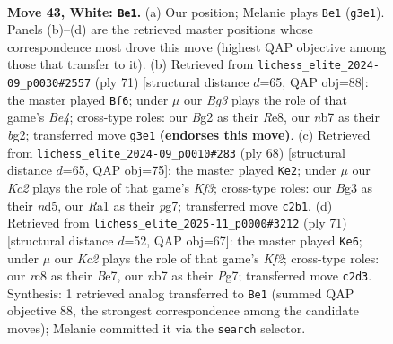 \documentclass[11pt]{article}
\begin{document}
\clearpage

\begin{figure}[p]\centering
\begin{subfigure}{0.46\textwidth}\centering
\resizebox{\linewidth}{!}{%
\newchessgame
\chessboard[
  setfen={1rr5/1n3kbp/p2p4/P3p1Pp/1pP1P3/1P3PBR/2K3B1/R7 w - - 0 43},
  showmover=false,
  pgfstyle=straightmove, color=movearrow, markmove={g3-e1}
]}
\caption{}
\end{subfigure}\hfill
\begin{subfigure}{0.46\textwidth}\centering
\resizebox{\linewidth}{!}{%
\newchessgame
\chessboard[
  setfen={4r3/3R2pk/2p1r3/p1B1bp2/P3p1p1/2P3P1/1P1R1PB1/6K1 b - - 1 36},
  showmover=false,
  pgfstyle=straightmove, color=movearrow, markmove={e5-f6}
]}
\caption{}
\end{subfigure}
\\[4pt]
\begin{subfigure}{0.46\textwidth}\centering
\resizebox{\linewidth}{!}{%
\newchessgame
\chessboard[
  setfen={4r3/5kp1/3r4/Bp1npp1p/1Pp4P/2P2KP1/3P1P2/R3R3 w - - 0 35},
  showmover=false,
  pgfstyle=straightmove, color=movearrow, markmove={f3-e2}
]}
\caption{}
\end{subfigure}\hfill
\begin{subfigure}{0.46\textwidth}\centering
\resizebox{\linewidth}{!}{%
\newchessgame
\chessboard[
  setfen={8/1r1rbkp1/p4p1p/4p2P/PPp5/2B3P1/2P2PK1/1R2R3 b - - 2 36},
  showmover=false,
  pgfstyle=straightmove, color=movearrow, markmove={f7-e6}
]}
\caption{}
\end{subfigure}
\caption{\textbf{Move 43, White: \texttt{Be1}.} (a) Our position; Melanie plays \texttt{Be1} (\texttt{g3e1}). Panels (b)--(d) are the retrieved master positions whose correspondence most drove this move (highest QAP objective among those that transfer to it). (b) Retrieved from \texttt{lichess\_elite\_2024-09\_p0030\#2557} (ply 71) [structural distance $d$=65, QAP obj=88]: the master played \texttt{Bf6}; under $\mu$ our \emph{Bg3} plays the role of that game's \emph{Be4}; cross-type roles: our \emph{B}g2 as their \emph{R}e8, our \emph{n}b7 as their \emph{b}g2; transferred move \texttt{g3e1} \textbf{(endorses this move)}. (c) Retrieved from \texttt{lichess\_elite\_2024-09\_p0010\#283} (ply 68) [structural distance $d$=65, QAP obj=75]: the master played \texttt{Ke2}; under $\mu$ our \emph{Kc2} plays the role of that game's \emph{Kf3}; cross-type roles: our \emph{B}g3 as their \emph{n}d5, our \emph{R}a1 as their \emph{p}g7; transferred move \texttt{c2b1}. (d) Retrieved from \texttt{lichess\_elite\_2025-11\_p0000\#3212} (ply 71) [structural distance $d$=52, QAP obj=67]: the master played \texttt{Ke6}; under $\mu$ our \emph{Kc2} plays the role of that game's \emph{Kf2}; cross-type roles: our \emph{r}c8 as their \emph{B}e7, our \emph{n}b7 as their \emph{P}g7; transferred move \texttt{c2d3}. Synthesis: 1 retrieved analog transferred to \texttt{Be1} (summed QAP objective 88, the strongest correspondence among the candidate moves); Melanie committed it via the \texttt{search} selector.}
\label{fig:thought-m84}
\end{figure}
\end{document}
